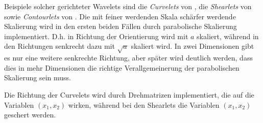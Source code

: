 
 Beispiele solcher gerichteter Wavelets sind die \textit{Curvelets} von \textcite{Candes2005}, die \textit{Shearlets} von \textcite{Kutyniok2008} sowie \textit{Contourlets} von \textcite{Contourlets}. Die mit feiner werdenden Skala schärfer werdende Skalierung wird in den ersten beiden Fällen durch parabolische Skalierung implementiert. D.h. in Richtung der Orientierung wird mit $a$ skaliert, während in den Richtungen senkrecht dazu mit $\sqrt a$ skaliert wird. In zwei Dimensionen gibt es nur eine weitere senkrechte Richtung, aber später wird deutlich werden, dass dies in mehr Dimensionen die richtige Verallgemeinerung der parabolischen Skalierung sein muss.

 Die Richtung der Curvelets wird durch Drehmatrizen implementiert, die auf die Variablen $(x_1,x_2)$ wirken, während bei den Shearlets die Variablen $(x_1,x_2)$ geschert werden.




